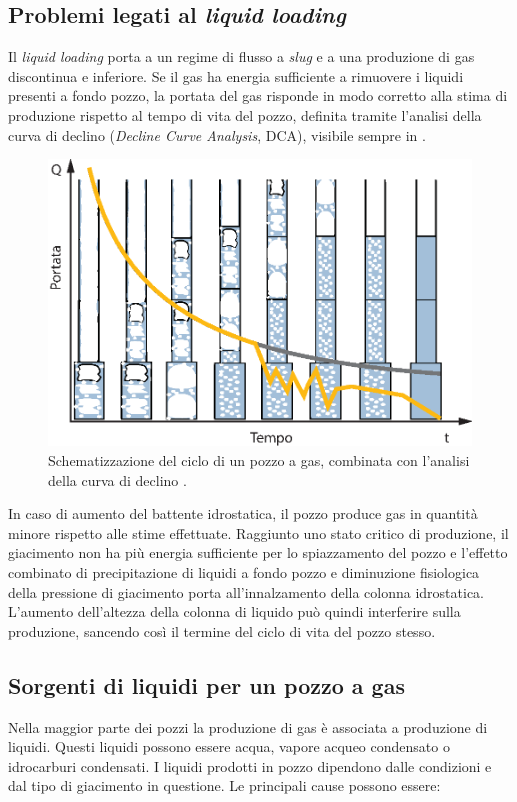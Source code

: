 \subsection{Problemi legati al \textit{liquid loading}}
Il \textit{liquid loading} porta a un regime di flusso a \textit{slug} e a una produzione di gas discontinua e inferiore. Se il gas ha energia sufficiente a rimuovere i liquidi presenti a fondo pozzo, la portata del gas risponde in modo corretto alla stima di produzione rispetto al tempo di vita del pozzo, definita tramite l'analisi della curva di declino (\textit{Decline Curve Analysis}, DCA), visibile sempre in .

\begin{figure}[htbp]
    \centering
    \includegraphics[width=.8\textwidth]{fig/foamer/declinecurve.eps}
    \caption{Schematizzazione del ciclo di un pozzo a gas, combinata con l'analisi della curva di declino \parencite{lea2011gas}.}
    \label{fig:declinecurve}
\end{figure}

In caso di aumento del battente idrostatica, il pozzo produce gas in quantità minore rispetto alle stime effettuate. Raggiunto uno stato critico di produzione, il giacimento non ha più energia sufficiente per lo spiazzamento del pozzo e l'effetto combinato di precipitazione di liquidi a fondo pozzo e diminuzione fisiologica della pressione di giacimento porta all'innalzamento della colonna idrostatica. L'aumento dell'altezza della colonna di liquido può quindi interferire sulla produzione, sancendo così il termine del ciclo di vita del pozzo stesso.
 
\subsection{Sorgenti di liquidi per un pozzo a gas}
Nella maggior parte dei pozzi la produzione di gas è associata a produzione di liquidi. Questi liquidi possono essere acqua, vapore acqueo condensato o idrocarburi condensati. I liquidi prodotti in pozzo dipendono dalle condizioni e dal tipo di giacimento in questione. Le principali cause possono essere:

